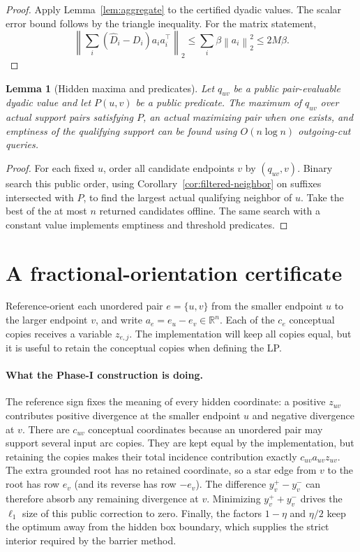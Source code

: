 \documentclass[11pt]{article}
\newtheorem{lemma}[theorem]{Lemma}
\theoremstyle{definition}
\newcommand{\R}{\mathbb{R}}
\newcommand{\norm}[1]{\left\lVert #1\right\rVert}
\begin{document}
\begin{proof}
Apply Lemma~\ref{lem:aggregate} to the certified dyadic values.  The scalar
error bound follows by the triangle inequality.  For the matrix statement,
\[
 \norm{\sum_i(\widehat D_i-D_i)a_ia_i^\top}_2
 \le\sum_i\beta\norm{a_i}_2^2\le2M\beta .
\]
\end{proof}

\begin{lemma}[Hidden maxima and predicates]\label{lem:hidden-max}
Let $q_{uv}$ be a public pair-evaluable dyadic value and let $P(u,v)$ be a
public predicate.  The maximum of $q_{uv}$ over actual support pairs satisfying
$P$, an actual maximizing pair when one exists, and emptiness of the
qualifying support can be found using $O(n\log n)$ outgoing-cut queries.
\end{lemma}

\begin{proof}
For each fixed $u$, order all candidate endpoints $v$ by
$(q_{uv},v)$.  Binary search this public order, using
Corollary~\ref{cor:filtered-neighbor} on suffixes intersected with $P$, to find
the largest actual qualifying neighbor of $u$.  Take the best of the at most
$n$ returned candidates offline.  The same search with a constant value
implements emptiness and threshold predicates.
\end{proof}

\section{A fractional-orientation certificate}\label{sec:orientation}

Reference-orient each unordered pair $e=\{u,v\}$ from the smaller endpoint
$u$ to the larger endpoint $v$, and write $a_e=e_u-e_v\in\R^n$.  Each of the
$c_e$ conceptual copies receives a variable $z_{e,j}$.  The implementation
will keep all copies equal, but it is useful to retain the conceptual copies
when defining the LP.

\paragraph{What the Phase-I construction is doing.}
The reference sign fixes the meaning of every hidden coordinate: a positive
$z_{uv}$ contributes positive divergence at the smaller endpoint $u$ and
negative divergence at $v$.  There are $c_{uv}$ conceptual coordinates
because an unordered pair may support several input arc copies.  They are
kept equal by the implementation, but retaining the copies makes their total
incidence contribution exactly $c_{uv}a_{uv}z_{uv}$.  The extra grounded
root has no retained coordinate, so a star edge from $v$ to the root has row
$e_v$ (and its reverse has row $-e_v$).  The difference
$y_v^+-y_v^-$ can therefore absorb any remaining divergence at $v$.
Minimizing $y_v^++y_v^-$ drives the $\ell_1$ size of this public correction
to zero.  Finally, the factors $1-\eta$ and $\eta/2$ keep the optimum away
from the hidden box boundary, which supplies the strict interior required by
the barrier method.
\end{document}
